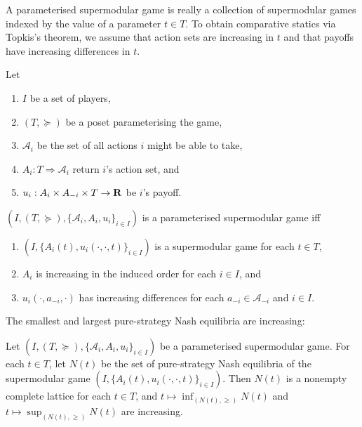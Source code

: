 \documentclass[11pt,letterpaper,reqno,oneside]{article}
\begin{document}
A parameterised supermodular game is really a collection of supermodular games indexed by the value of a parameter $t \in T$. To obtain comparative statics via Topkis's theorem, we assume that action sets are increasing in $t$ and that payoffs have increasing differences in $t$.
%
\begin{definition}
	Let
	\begin{enumerate}

		\item $I$ be a set of players,

		\item $(T,\succeq)$ be a poset parameterising the game,

		\item $\mathcal{A}_i$ be the set of all actions $i$ might be able to take,

		\item $A_i : T \Rightarrow \mathcal{A}_i$ return $i$'s action set, and

		\item $u_i : A_i \times A_{-i} \times T \to \mathbf{R}$ be $i$'s payoff.

	\end{enumerate}
	$(I,(T,\succeq),\{\mathcal{A}_i,A_i,u_i\}_{i \in I})$ is a parameterised supermodular game iff
	\begin{enumerate}

		\item $(I,\{A_i(t),u_i(\cdot,\cdot,t)\}_{i \in I})$ is a supermodular game for each $t \in T$,

		\item $A_i$ is increasing in the induced order for each $i \in I$, and

		\item $u_i(\cdot,a_{-i},\cdot)$ has increasing differences for each $a_{-i} \in \mathcal{A}_{-i}$ and $i \in I$.

	\end{enumerate}
\end{definition}


The smallest and largest pure-strategy Nash equilibria are increasing:

\begin{corollary}
	Let $(I,(T,\succeq),\{\mathcal{A}_i,A_i,u_i\}_{i \in I})$ be a parameterised supermodular game. For each $t \in T$, let $N(t)$ be the set of pure-strategy Nash equilibria of the supermodular game $(I,\{A_i(t),u_i(\cdot,\cdot,t)\}_{i \in I})$. Then $N(t)$ is a nonempty complete lattice for each $t \in T$, and $t \mapsto \inf_{(N(t),\geq)} N(t)$ and $t \mapsto \sup_{(N(t),\geq)} N(t)$ are increasing.
\end{corollary}
\end{document}
